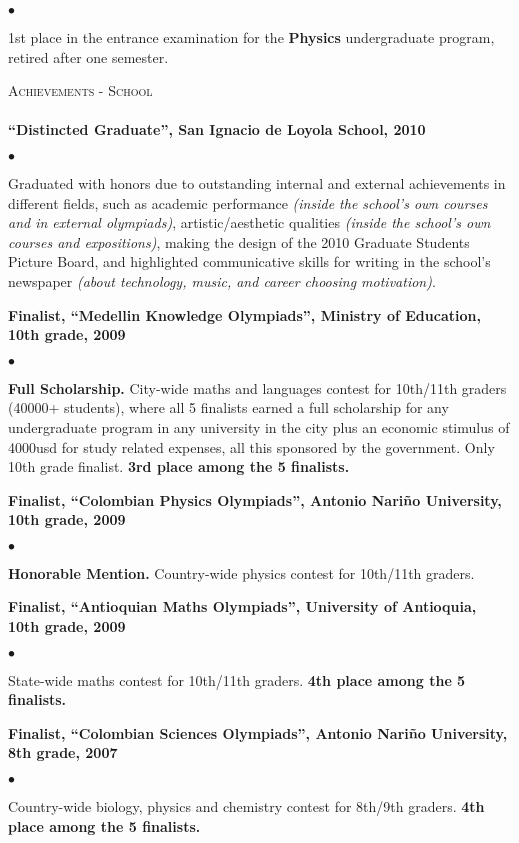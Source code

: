 \documentclass{article}
\newcommand{\lineunder}{\vspace*{-8pt} \\ \hspace*{-18pt} \hrulefill \\}
\newcommand{\header}[1]{{\hspace*{-15pt}\vspace*{6pt}
    \textsc{#1}} \vspace*{-6pt} \lineunder}
\newenvironment{achievements}{\begin{list}{$\bullet$}{\topsep 2pt \itemsep
      -2pt}}{\vspace*{5pt}\end{list}}
\begin{document}
\begin{achievements}
\item 1st place in the entrance examination for the \textbf{Physics} undergraduate program, retired after one semester.
\end{achievements}
\header{Achievements - School}
\textbf{``Distincted Graduate'', San Ignacio de Loyola School, 2010}
\begin{achievements}
\item Graduated with honors due to outstanding internal and external achievements in different fields, such as academic performance \textit{(inside the school's own courses and in external olympiads)}, artistic/aesthetic qualities \textit{(inside the school's own courses and expositions)}, making the design of the 2010 Graduate Students Picture Board, and highlighted communicative skills for writing in the school's newspaper \textit{(about technology, music, and career choosing motivation)}.
\end{achievements}
\textbf{Finalist, ``Medellin Knowledge Olympiads'', Ministry of Education, 10th grade, 2009}
\begin{achievements}
\item \textbf{Full Scholarship.} City-wide maths and languages contest for 10th/11th graders (40000+ students), where all 5 finalists earned a full scholarship for any undergraduate program in any university in the city plus an economic stimulus of 4000usd for study related expenses, all this sponsored by the government. Only 10th grade finalist. \textbf{3rd place among the 5 finalists.}
\end{achievements}
\textbf{Finalist, ``Colombian Physics Olympiads'', Antonio Nari\~no University, 10th grade, 2009}
\begin{achievements} 
\item \textbf{Honorable Mention.} Country-wide physics contest for 10th/11th graders.
\end{achievements}
\textbf{Finalist, ``Antioquian Maths Olympiads'', University of Antioquia, 10th grade, 2009}
\begin{achievements}
\item State-wide maths contest for 10th/11th graders. \textbf{4th place among the 5 finalists.}
\end{achievements}
\textbf{Finalist, ``Colombian Sciences Olympiads'', Antonio Nari\~no University, 8th grade, 2007}
\begin{achievements} 
\item Country-wide biology, physics and chemistry contest for 8th/9th graders. \textbf{4th place among the 5 finalists.}
\end{achievements}
\end{document}

